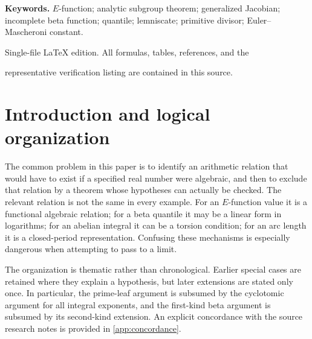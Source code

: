 \documentclass[11pt,a4paper]{article}
\numberwithin{equation}{section}
\theoremstyle{definition}
\theoremstyle{remark}
\begin{document}
\begin{titlepage}
\begin{minipage}{0.93\textwidth}
\medskip
\textbf{Keywords.} $E$-function; analytic subgroup theorem; generalized
Jacobian; incomplete beta function; quantile; lemniscate; primitive divisor;
Euler--Mascheroni constant.
\end{minipage}
\vfill
{\small Single-file \LaTeX{} edition. All formulas, tables, references, and the\par
representative verification listing are contained in this source.\par}
\end{titlepage}
\begingroup
\small
\setlength{\parskip}{0pt}
\linespread{1}\selectfont
\tableofcontents
\endgroup
\clearpage

\section{Introduction and logical organization}\label{sec:intro}
The common problem in this paper is to identify an arithmetic relation that
would have to exist if a specified real number were algebraic, and then to
exclude that relation by a theorem whose hypotheses can actually be checked.
The relevant relation is not the same in every example. For an $E$-function
value it is a functional algebraic relation; for a beta quantile it may be a
linear form in logarithms; for an abelian integral it can be a torsion condition;
for an arc length it is a closed-period representation. Confusing these
mechanisms is especially dangerous when attempting to pass to a limit.

The organization is thematic rather than chronological. Earlier special cases
are retained where they explain a hypothesis, but later extensions are stated
only once. In particular, the prime-leaf argument is subsumed by the
cyclotomic argument for all integral exponents, and the first-kind beta
argument is subsumed by its second-kind extension. An explicit concordance
with the source research notes is provided in \cref{app:concordance}.
\end{document}
